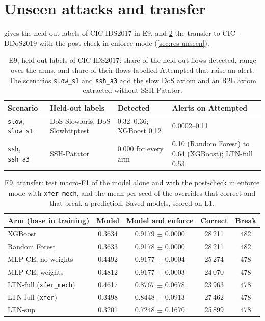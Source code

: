 \FloatBarrier
\section{Unseen attacks and transfer}

 gives the held-out labels of CIC-IDS2017 in E9, and \cref{tab:app-transfer-postcheck}
the transfer to CIC-DDoS2019 with the post-check in enforce mode (\cref{sec:res-unseen}).


\begin{table}[htbp]
\centering
\footnotesize
\caption{E9, held-out labels of CIC-IDS2017: share of the held-out flows detected, range over the arms, and share of
their flows labelled Attempted that raise an alert. The scenarios \texttt{slow\_s1} and \texttt{ssh\_a3} add the slow
DoS axiom and an R2L axiom extracted without SSH-Patator.}
\label{tab:app-e9}
\setlength{\tabcolsep}{4pt}
\begin{tabular}{@{}p{2.6cm}p{3.4cm}p{3.4cm}p{3.0cm}@{}}
\toprule
Scenario & Held-out labels & Detected & Alerts on Attempted \\
\midrule
\texttt{slow}, \texttt{slow\_s1} & DoS Slowloris, DoS Slowhttptest & 0.32--0.36; XGBoost 0.12 & 0.0002--0.11 \\
\texttt{ssh}, \texttt{ssh\_a3}   & SSH-Patator & 0.000 for every arm & 0.10 (Random Forest) to 0.64 (XGBoost); LTN-full 0.53 \\
\bottomrule
\end{tabular}
\end{table}

\begin{table}[htbp]
\centering
\footnotesize
\caption{E9, transfer: test macro-F1 of the model alone and with the post-check in enforce mode with
\texttt{xfer\_mech}, and the mean per seed of the overrides that correct and that break a prediction. Saved models,
scored on L1.}
\label{tab:app-transfer-postcheck}
\setlength{\tabcolsep}{4pt}
\begin{tabular}{@{}lcccc@{}}
\toprule
Arm (base in training) & Model & Model and enforce & Correct & Break \\
\midrule
XGBoost              & 0.3634 & 0.9179 $\pm$ 0.0000 & 28\,211 & 482 \\
Random Forest        & 0.3633 & 0.9178 $\pm$ 0.0000 & 28\,211 & 482 \\
MLP-CE, no weights   & 0.4492 & 0.9177 $\pm$ 0.0004 & 25\,274 & 478 \\
MLP-CE, weights      & 0.4812 & 0.9177 $\pm$ 0.0003 & 24\,070 & 478 \\
LTN-full (\texttt{xfer\_mech}) & 0.4617 & 0.8767 $\pm$ 0.0678 & 23\,963 & 478 \\
LTN-full (\texttt{xfer}) & 0.3498 & 0.8448 $\pm$ 0.0913 & 27\,462 & 478 \\
LTN-sup              & 0.3201 & 0.7248 $\pm$ 0.1670 & 25\,899 & 478 \\
\bottomrule
\end{tabular}
\end{table}

